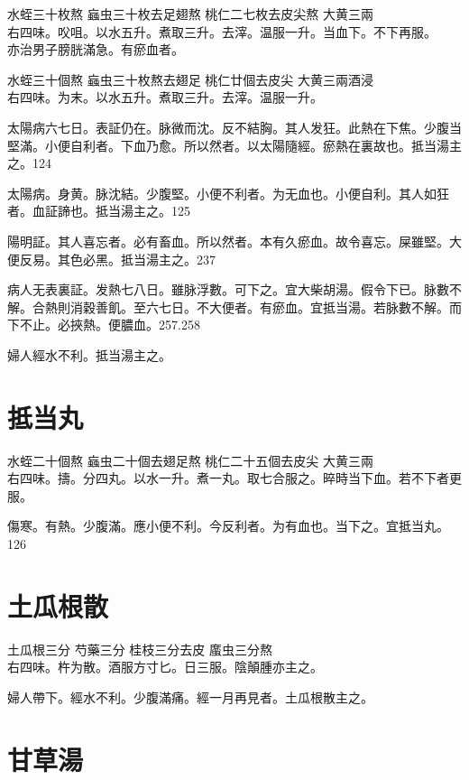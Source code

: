 水蛭{\scriptsize 三十枚熬} 蝱虫{\scriptsize 三十枚去足翅熬} 桃仁{\scriptsize 二七枚去皮尖熬} 大黄{\scriptsize 三兩}\\
右四味。㕮咀。以水五升。煮取三升。去滓。温服一升。当血下。不下再服。\\
亦治男子膀胱滿急。有瘀血者。{\wuben}

水蛭{\scriptsize 三十個熬} 蝱虫{\scriptsize 三十枚熬去翅足} 桃仁{\scriptsize 廿個去皮尖} 大黄{\scriptsize 三兩酒浸}\\
右四味。为末。以水五升。煮取三升。去滓。温服一升。{\dengben}

太陽病六七日。表証仍在。脉微而沈。反不結胸。其人发狂。此熱在下焦。少腹当堅滿。小便自利者。下血乃愈。所以然者。以太陽隨經。瘀熱在裏故也。抵当湯主之。124

太陽病。身黄。脉沈結。少腹堅。小便不利者。为无血也。小便自利。其人如狂者。血証諦也。抵当湯主之。125

陽明証。其人喜忘者。必有畜血。所以然者。本有久瘀血。故令喜忘。屎雖堅。大便反易。其色必黑。抵当湯主之。237

病人无表裏証。发熱七八日。雖脉浮數。可下之。{\khaaitp 宜大柴胡湯。}假令下已。脉數不解。合熱則消穀善飢。至六七日。不大便者。有瘀血。宜抵当湯。若脉數不解。而下不止。必挾熱。便膿血。257.258

婦人經水不利。抵当湯主之。

\section{抵当丸}

水蛭{\scriptsize 二十個熬} 蝱虫{\scriptsize 二十個去翅足熬} 桃仁{\scriptsize 二十五個去皮尖} 大黄{\scriptsize 三兩}\\
右四味。擣。分四丸。以水一升。煮一丸。取七合服之。晬時当下血。若不下者更服。

傷寒。有熱。少腹滿。應小便不利。今反利者。为有血也。当下之。宜抵当丸。126

\section{土瓜根散}

土瓜根{\scriptsize 三分} 芍藥{\scriptsize 三分} 桂枝{\scriptsize 三分去皮} 䗪虫{\scriptsize 三分熬}\\
右四味。杵为散。酒服方寸匕。日三服。{\khaaitp 陰顛腫亦主之。}

{\khaaitp 婦人}帶下。經水不利。少腹滿痛。經一月再見者。土瓜根散主之。

\section{甘草湯}

